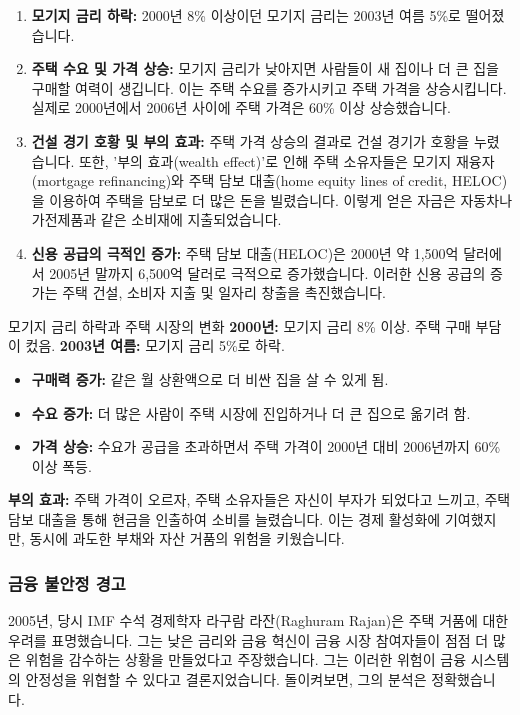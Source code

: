 \documentclass[11pt,a4paper]{article}
\theoremstyle{definition}
\begin{document}
\begin{enumerate}
    \item \textbf{모기지 금리 하락:}
    2000년 8\% 이상이던 모기지 금리는 2003년 여름 5\%로 떨어졌습니다.

    \item \textbf{주택 수요 및 가격 상승:}
    모기지 금리가 낮아지면 사람들이 새 집이나 더 큰 집을 구매할 여력이 생깁니다. 이는 주택 수요를 증가시키고 주택 가격을 상승시킵니다. 실제로 2000년에서 2006년 사이에 주택 가격은 60\% 이상 상승했습니다.

    \item \textbf{건설 경기 호황 및 부의 효과:}
    주택 가격 상승의 결과로 건설 경기가 호황을 누렸습니다. 또한, '부의 효과(wealth effect)'로 인해 주택 소유자들은 모기지 재융자(mortgage refinancing)와 주택 담보 대출(home equity lines of credit, HELOC)을 이용하여 주택을 담보로 더 많은 돈을 빌렸습니다. 이렇게 얻은 자금은 자동차나 가전제품과 같은 소비재에 지출되었습니다.

    \item \textbf{신용 공급의 극적인 증가:}
    주택 담보 대출(HELOC)은 2000년 약 1,500억 달러에서 2005년 말까지 6,500억 달러로 극적으로 증가했습니다. 이러한 신용 공급의 증가는 주택 건설, 소비자 지출 및 일자리 창출을 촉진했습니다.
\end{enumerate}

\begin{examplebox}{모기지 금리 하락과 주택 시장의 변화}
\textbf{2000년:} 모기지 금리 8\% 이상. 주택 구매 부담이 컸음.
\textbf{2003년 여름:} 모기지 금리 5\%로 하락.
\begin{itemize}
    \item \textbf{구매력 증가:} 같은 월 상환액으로 더 비싼 집을 살 수 있게 됨.
    \item \textbf{수요 증가:} 더 많은 사람이 주택 시장에 진입하거나 더 큰 집으로 옮기려 함.
    \item \textbf{가격 상승:} 수요가 공급을 초과하면서 주택 가격이 2000년 대비 2006년까지 60\% 이상 폭등.
\end{itemize}
\textbf{부의 효과:} 주택 가격이 오르자, 주택 소유자들은 자신이 부자가 되었다고 느끼고, 주택 담보 대출을 통해 현금을 인출하여 소비를 늘렸습니다. 이는 경제 활성화에 기여했지만, 동시에 과도한 부채와 자산 거품의 위험을 키웠습니다.
\end{examplebox}

\subsubsection{금융 불안정 경고}
2005년, 당시 IMF 수석 경제학자 라구람 라잔(Raghuram Rajan)은 주택 거품에 대한 우려를 표명했습니다. 그는 낮은 금리와 금융 혁신이 금융 시장 참여자들이 점점 더 많은 위험을 감수하는 상황을 만들었다고 주장했습니다. 그는 이러한 위험이 금융 시스템의 안정성을 위협할 수 있다고 결론지었습니다. 돌이켜보면, 그의 분석은 정확했습니다.
\end{document}
